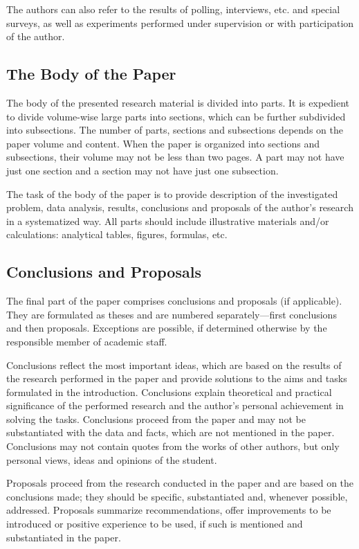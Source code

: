 The authors can also refer to the results of polling, interviews, etc. and special surveys, as well as experiments performed under supervision or with participation of the author.

\subsection{The Body of the Paper}

The body of the presented research material is divided into parts. It is expedient to divide volume-wise large parts into sections, which can be further subdivided into subsections. The number of parts, sections and subsections depends on the paper volume and content. When the paper is organized into sections and subsections, their volume may not be less than two pages. A part may not have just one section and a section may not have just one subsection.

The task of the body of the paper is to provide description of the investigated problem, data analysis, results, conclusions and proposals of the author’s research in a systematized way. All parts should include illustrative materials and/or calculations: analytical tables, figures, formulas, etc.

\subsection{Conclusions and Proposals}

The final part of the paper comprises conclusions and proposals (if applicable). They are formulated as theses and are numbered separately—first conclusions and then proposals. Exceptions are possible, if determined otherwise by the responsible member of academic staff.

Conclusions reflect the most important ideas, which are based on the results of the research performed in the paper and provide solutions to the aims and tasks formulated in the introduction. Conclusions explain theoretical and practical significance of the performed research and the author’s personal achievement in solving the tasks. Conclusions proceed from the paper and may not be substantiated with the data and facts, which are not mentioned in the paper. Conclusions may not contain quotes from the works of other authors, but only personal views, ideas and opinions of the student.

Proposals proceed from the research conducted in the paper and are based on the conclusions made; they should be specific, substantiated and, whenever possible, addressed. Proposals summarize recommendations, offer improvements to be introduced or positive experience to be used, if such is mentioned and substantiated in the paper.